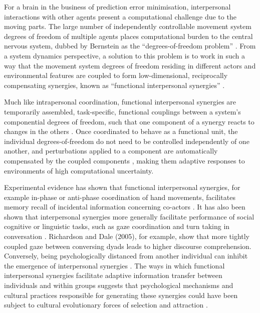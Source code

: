 For a brain in the business of prediction error minimisation, interpersonal interactions with other agents present a computational challenge due to the moving parts.  The large number of independently controllable movement system degrees of freedom of multiple agents places computational burden to the central nervous system, dubbed by Bernstein \textcite{Bernstein1967} as the ``degrees-of-freedom problem'' \citep[see also][]{Turvey1982,Turvey1990}.  From a system dynamics perspective, a solution to this problem is to work in such a way that the movement system degrees of freedom residing in different actors and environmental features are coupled to form low-dimensional, reciprocally compensating synergies, known as ``functional interpersonal synergies'' \citep{Riley2011}.

Much like intrapersonal coordination, functional interpersonal synergies are temporarily assembled, task-specific, functional couplings between a system's componential degrees of freedom, such that one component of a synergy reacts to changes in the others \citep{Kelso2009}.  Once coordinated to behave as a functional unit, the individual degrees-of-freedom do not need to be controlled independently of one another, and perturbations applied to a component are automatically compensated by the coupled components \citep{Kelso1984,Latash2002,Riley2011}, making them adaptive responses to environments of high computational uncertainty.

Experimental evidence has shown that functional interpersonal synergies, for example in-phase or anti-phase coordination of hand movements, facilitates memory recall of incidental information concerning co-actors \citep{Miles2010}. It has also been shown that interpersonal synergies more generally facilitate performance of social cognitive or linguistic tasks, such as gaze coordination and turn taking in conversation \citep{Richardson2005,Shockley2009}.  Richardson and Dale (2005), for example, show that more tightly coupled gaze between conversing dyads leads to higher discourse comprehension.  Conversely, being psychologically distanced from another individual can inhibit the emergence of interpersonal synergies \citep{Miles2010}.  The ways in which functional interpersonal synergies facilitate adaptive information transfer between individuals and within groups suggests that psychological mechanisms and cultural practices responsible for generating these synergies could have been subject to cultural evolutionary forces of selection and attraction \citep{Claidiere2014,Mesoudi2016a}.

